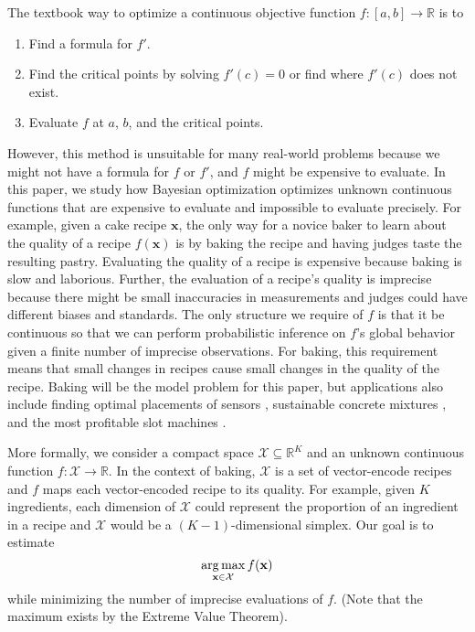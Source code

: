 The textbook way to optimize a continuous objective function $f: [a, b] \to \mathbb{R}$ is to
\begin{enumerate}
    \item Find a formula for $f'$.
    \item Find the critical points by solving $f'(c) = 0$ or find where $f'(c)$ does not exist.
    \item Evaluate $f$ at $a$, $b$, and the critical points.
\end{enumerate}
However, this method is unsuitable for many real-world problems because
we might not have a formula for $f$ or $f'$, and $f$ might be expensive to evaluate.
In this paper, we study how Bayesian optimization optimizes unknown continuous functions that are expensive to evaluate and impossible to evaluate precisely.
For example, given a cake recipe $\mathbf{x}$, the only way for a novice baker to learn about
the quality of a recipe $f(\mathbf{x})$ is by baking the recipe and having judges taste the resulting pastry.
Evaluating the quality of a recipe is expensive because baking is slow and laborious.
Further, the evaluation of a recipe's quality is imprecise because there might be small inaccuracies in measurements
and judges could have different biases and standards.
The only structure we require of $f$ is that it be continuous so that we can perform probabilistic inference on $f$'s global behavior given 
a finite number of imprecise observations.
For baking, this requirement means that small changes in recipes cause small changes in the quality of the recipe.
Baking will be the model problem for this paper, but applications also
include finding optimal placements of sensors \cite{capl2017}, sustainable concrete mixtures \cite{ament2023},
and the most profitable slot machines \cite{shahriari2016}.

More formally, we consider a compact space $\mathcal{X} \subseteq \mathbb{R}^{K}$  and an unknown continuous function $f: \mathcal{X} \to \mathbb{R}$.
In the context of baking, $\mathcal{X}$ is a set of vector-encode recipes
and $f$ maps each vector-encoded recipe to its quality.
For example, given $K$ ingredients, each dimension of $\mathcal{X}$ could represent the proportion of an ingredient in a recipe
and $\mathcal{X}$ would be a $(K - 1)$-dimensional simplex.
Our goal is to estimate
\begin{equation}\label{eq:obj}
    \operatorname*{arg\,max}_{\mathbf{x} \in \mathcal{X}} f(\mathbf{x})
\end{equation}
while minimizing the number of imprecise evaluations of $f$.
(Note that the maximum exists by the Extreme Value Theorem).

